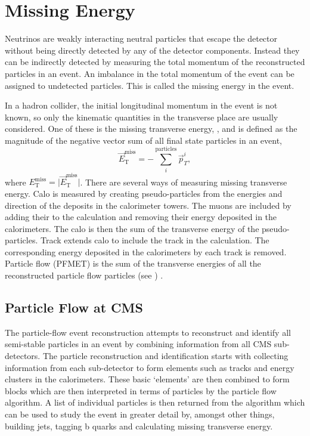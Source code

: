 \section{Missing Energy} 
Neutrinos are weakly interacting neutral particles that escape the
detector without being directly detected by any of the detector components. 
Instead they can be indirectly detected by measuring the total momentum of the
reconstructed particles in an event.
An imbalance in the total momentum of the event can be assigned to undetected
particles. 
This is called the missing energy in the event.

In a hadron collider, the initial longitudinal momentum in the event is not
known, so only the kinematic quantities in the transverse place are usually
considered.  One of these is the missing transverse energy, \ETm, and is defined
as the magnitude of the negative vector sum of all final state particles in an
event,
\begin{equation}
\vec{E}^{\text{miss}}_{\text{T}} = -\sum_i^{\text{particles}} \vec{p}_{T}^{i},
\end{equation}
where ${E}^{\text{miss}}_{\text{T}} = \vert \vec{E}^{\text{miss}}_{\text{T}}
\vert $.
There are several ways of measuring missing transverse energy.
Calo \ETm is measured by creating pseudo-particles from the energies and
direction of the deposits in the calorimeter towers. The muons are included by
adding their \Pt to the calculation and removing their energy deposited in the
calorimeters. The calo \ETm is then the sum of the transverse energy of the
pseudo-particles.
Track \ETm extends calo \ETm to include the track \Pt in the calculation.  The
corresponding energy deposited in the calorimeters by each track is removed.
Particle flow \ETm (PFMET) is the sum of the transverse energies of all the
reconstructed particle flow particles (see ) \cite{PF}.

\subsection{Particle Flow at CMS}
\label{sec:pf}
The particle-flow event reconstruction attempts to reconstruct and identify all
semi-stable particles in an event by combining information from all CMS
sub-detectors. The particle reconstruction and identification starts with
collecting information from each sub-detector to form elements such as tracks
and energy clusters in the calorimeters. These basic `elements' are then
combined to form blocks which are then interpreted in terms of particles by the
particle flow algorithm. A list of individual particles is then returned from
the algorithm which can be used to study the event in greater detail by,
amongst other things, building jets, tagging b quarks and calculating missing
transverse energy\cite{PF}.

